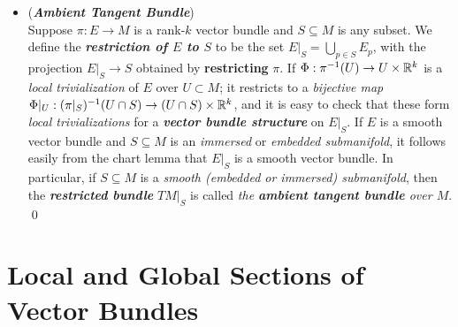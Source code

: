 \documentclass[11pt]{article}
\begin{document}
\begin{itemize}
\item \begin{example} (\textbf{\emph{Ambient Tangent Bundle}})\\
Suppose $\pi: E \rightarrow M$ is a rank-$k$ vector bundle and $S \subseteq M$ is any subset. We define the \emph{\textbf{restriction of $E$ to $S$}} to be
the set $E|_{S} = \bigcup_{p\in S} E_p$, with the projection $E|_{S} \rightarrow S$ obtained by \textbf{restricting} $\pi$. If $\Phi:  \pi^{-1}(U) \rightarrow U \times {\mathbb R}^k$ is a \emph{local trivialization} of $E$ over $U \subset M$; it restricts to a \emph{bijective map} $\Phi|_{U}: (\pi|_{S})^{-1}(U \cap S) \rightarrow (U \cap S) \times {\mathbb R}^k$, and it is easy to check that these form \emph{local trivializations} for a \emph{\textbf{vector bundle structure}} on $E|_{S}$. 
If $E$ is a smooth vector bundle and $S \subseteq M$ is an \emph{immersed} or\emph{ embedded submanifold}, it follows easily from the chart lemma that $E|_{S}$ is a smooth vector bundle. In particular, if $S \subseteq M$ is a \emph{smooth (embedded or immersed) submanifold}, then the \emph{\textbf{restricted bundle}} $TM|_{S}$ is called \emph{the \textbf{ambient tangent bundle} over $M$}. \qed
\end{example}
\end{itemize}
\section{Local and Global Sections of Vector Bundles}
\end{document}
